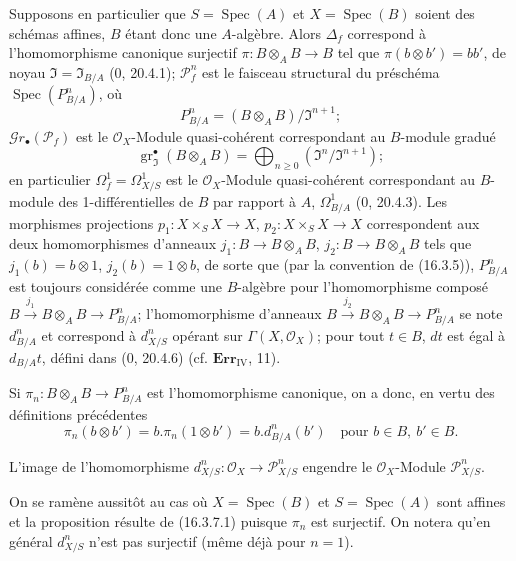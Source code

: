 \begin{env}[16.3.7]
\label{IV.16.3.7}
Supposons en particulier que $S=\operatorname{Spec}(A)$ et
$X=\operatorname{Spec}(B)$ soient des schémas affines, $B$ étant donc une
$A$-algèbre. Alors $\Delta_f$ correspond à l'homomorphisme canonique surjectif
$\pi:B\otimes_A B\to B$ tel que $\pi(b\otimes b')=bb'$, de noyau
$\mathfrak{I}=\mathfrak{I}_{B/A}$ (0, 20.4.1); $\mathscr{P}_f^n$ est le faisceau
structural du préschéma $\operatorname{Spec}(P_{B/A}^n)$, où
\[
  P_{B/A}^n=(B\otimes_A B)/\mathfrak{I}^{n+1};
\]
$\mathscr{G}r_\bullet(\mathscr{P}_f)$ est le $\mathcal{O}_X$-Module
quasi-cohérent correspondant au $B$-module gradué
\[
  \operatorname{gr}_{\mathfrak{I}}^\bullet(B\otimes_A B)
  =\bigoplus_{n\geq 0}(\mathfrak{I}^n/\mathfrak{I}^{n+1});
\]
en particulier $\Omega_f^1=\Omega_{X/S}^1$ est le $\mathcal{O}_X$-Module
quasi-cohérent correspondant au $B$-module des 1-différentielles de $B$ par
rapport à $A$, $\Omega_{B/A}^1$ (0, 20.4.3). Les morphismes projections
$p_1:X\times_S X\to X$, $p_2:X\times_S X\to X$ correspondent aux deux
homomorphismes d'anneaux $j_1:B\to B\otimes_A B$, $j_2:B\to B\otimes_A B$
tels que $j_1(b)=b\otimes 1$, $j_2(b)=1\otimes b$, de sorte que (par la
convention de (16.3.5)), $P_{B/A}^n$ est toujours considérée comme une
$B$-algèbre pour l'homomorphisme composé
$B\xrightarrow{j_1}B\otimes_A B\to P_{B/A}^n$; l'homomorphisme d'anneaux
$B\xrightarrow{j_2}B\otimes_A B\to P_{B/A}^n$ se note $d_{B/A}^n$ et correspond
à $d_{X/S}^n$ opérant sur $\Gamma(X,\mathcal{O}_X)$; pour tout $t\in B$, $dt$
est égal à $d_{B/A}t$, défini dans (0, 20.4.6) (cf. $\mathbf{Err}_{\mathrm{IV}}$,
11).

Si $\pi_n:B\otimes_A B\to P_{B/A}^n$ est l'homomorphisme canonique, on a donc,
en vertu des définitions précédentes
\[
  \pi_n(b\otimes b')=b.\pi_n(1\otimes b')=b.d_{B/A}^n(b')
  \quad\text{pour }b\in B,\ b'\in B.
  \tag{16.3.7.1}
  \label{IV.16.3.7.1}
\]
\end{env}

\begin{proposition}[16.3.8]
\label{IV.16.3.8}
L'image de l'homomorphisme $d_{X/S}^n:\mathcal{O}_X\to\mathscr{P}_{X/S}^n$
engendre le $\mathcal{O}_X$-Module $\mathscr{P}_{X/S}^n$.
\end{proposition}

On se ramène aussitôt au cas où $X=\operatorname{Spec}(B)$ et
$S=\operatorname{Spec}(A)$ sont affines et la proposition résulte de (16.3.7.1)
puisque $\pi_n$ est surjectif. On notera qu'en général $d_{X/S}^n$ n'est pas
surjectif (même déjà pour $n=1$).

